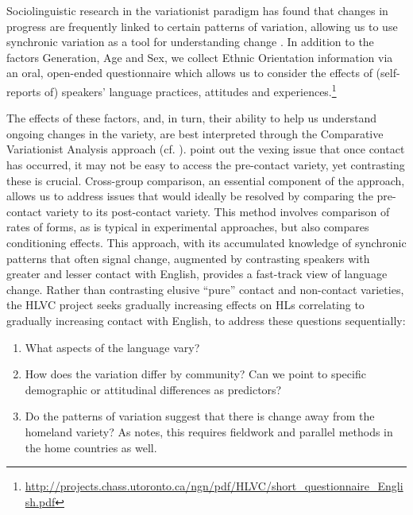 \documentclass[output=paper]{LSP/langsci}
\begin{document}
Sociolinguistic research in the variationist paradigm                                                  
has %
found %
that changes in progress are frequently linked to certain patterns of variation, allowing us to use synchronic variation as a tool for understanding change \citep{bailey_apparent_1991,labov_principles_2001,labov_transmission_2007}. In addition to the factors Generation, Age and Sex, we collect Ethnic Orientation information via an oral, open-ended questionnaire which allows us to consider the effects of (self-reports of) speakers’ language practices, attitudes and experiences.\footnote{\url{http://projects.chass.utoronto.ca/ngn/pdf/HLVC/short_questionnaire_English.pdf}}

The effects of these factors, and, in turn, their ability to help us understand ongoing changes in the variety, are best interpreted through the Comparative Variationist Analysis approach (cf. \citealt{labov_sociolinguistic_1972,tagliamonte_analysing_2006,walker_variation_2010}). \citet[111]{thomason_language_1988} point out the vexing issue that once contact has occurred, it may not be easy to access the pre-contact variety, yet contrasting these is crucial. Cross-group comparison, an essential component of the approach, allows us to address issues that would ideally be resolved by comparing the pre-contact variety to its post-contact variety. This method involves comparison of rates of forms, as is typical in experimental approaches, but also compares conditioning effects. This approach, with its accumulated knowledge of synchronic patterns that often signal change, augmented by contrasting speakers with greater and lesser contact with English, provides a fast-track view of language change. Rather than contrasting elusive “pure” contact and non-contact varieties, the HLVC project seeks gradually increasing effects on HLs correlating to gradually increasing contact with English, to address these questions sequentially: 

\begin{enumerate}
\item What aspects of the language vary?

\item How does the variation differ by community? Can we point to specific demographic or attitudinal differences as predictors?

\item Do the patterns of variation suggest that there is change away from the homeland variety? As \citet{thomason_language_2001} notes, this requires fieldwork and parallel methods in the home countries as well. 
\end{enumerate}
\end{document}
